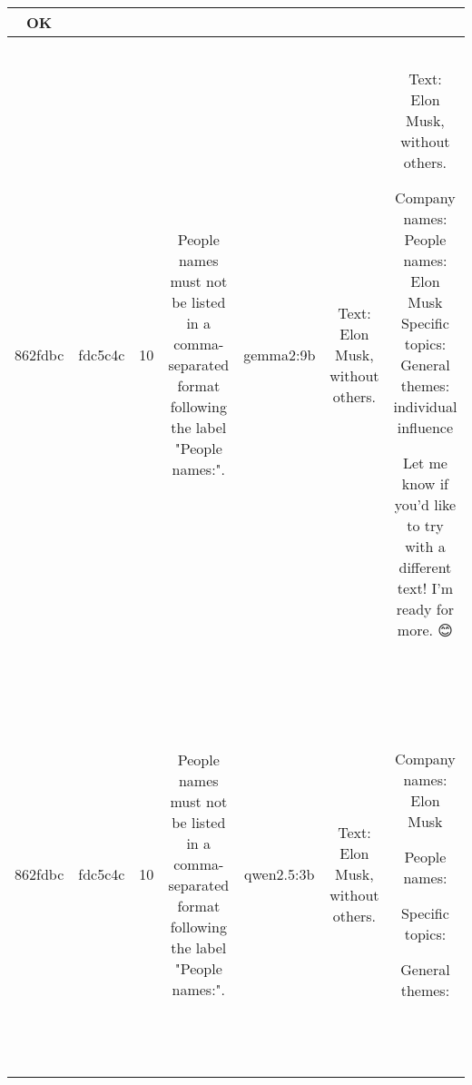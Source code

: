 \begin{table}[h!]
\begin{tabular}{|c|c|c|c|c|c|c|c|c|c|}
OK & \\
\hline
862fdbc & fdc5c4c & 10 & People names must not be listed in a comma-separated format following the label "People names:". & gemma2:9b & Text: Elon Musk, without others. & Text: Elon Musk, without others.

Company names:  
People names: Elon Musk 
Specific topics:  
General themes:  individual influence  


Let me know if you'd like to try with a different text! I'm ready for more. 😊 
 & err & The chatbot description specifies that the output should follow a particular format:

1. "Company names: <comma_separated_list_of_company_names>"
2. "People names: -||-"
3. "Specific topics: -||-"
4. "General themes: -||-"

In the provided output, the format is mostly followed, however, there is a slight deviation. Specifically, the format requires a comma-separated list for all categories, but in the provided output, there are spaces between "People names:" and "Elon Musk" and similarly for "General themes: individual influence", additional spaces exist, this doesn't strictly align with the "-||-" guidance for a comma-separated list, which assumes no filler text. Also, there is additional text at the end, "Let me know if you'd like to try with a different text! I'm ready for more. 😊", which is not part of the desired output format.

Thus, the specific points of deviation are:
- Spaces used after the labels "People names" and "General themes" instead of just a comma-separated list.
- Additional text which does not conform to the specified desired format.

ERR & \\
\hline
862fdbc & fdc5c4c & 10 & People names must not be listed in a comma-separated format following the label "People names:". & qwen2.5:3b & Text: Elon Musk, without others. & Company names: Elon Musk

People names: 

Specific topics: 

General themes: & err & The chatbot output does not comply with the description. According to the desired format outlined in the description, the information extracted should be provided in the format of a comma-separated list of company names, people names, specific topics, and general themes. 

- The line for company names contains a personal name "Elon Musk" instead of a company name, which is a violation of the categorization requirement.
- The lists for people names, specific topics, and general themes are empty. While this may be correct depending on the input, without it, I can't determine compliance in those areas. It is not possible to evaluate correctness due to the absence of input, but we can identify the misplacement of the entity.


\end{tabular}
\end{table}

